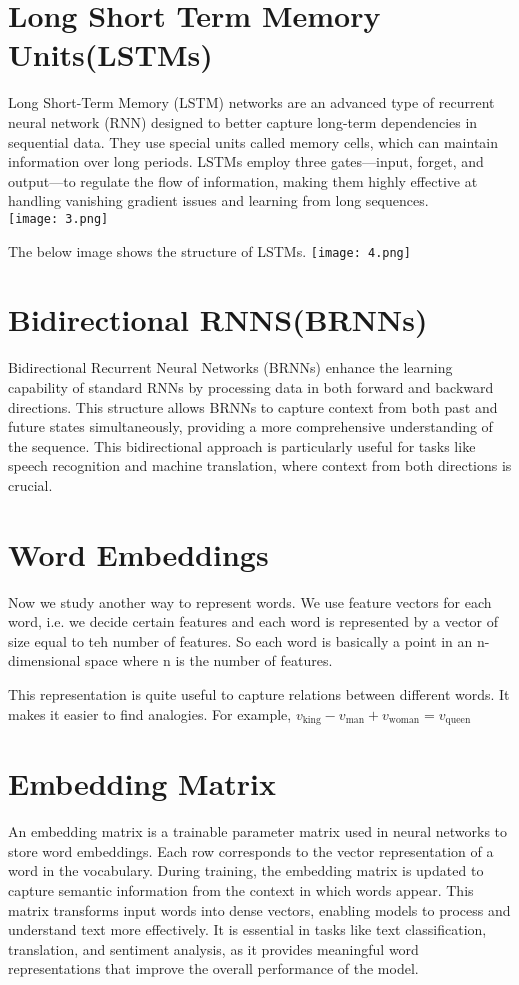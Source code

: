 \documentclass{article}
\begin{document}
\section{\Huge Long Short Term Memory Units(LSTMs)}
Long Short-Term Memory (LSTM) networks are an advanced type of recurrent neural network (RNN) designed to better capture long-term dependencies in sequential data. They use special units called memory cells, which can maintain information over long periods. LSTMs employ three gates—input, forget, and output—to regulate the flow of information, making them highly effective at handling vanishing gradient issues and learning from long sequences. \\

\texttt{[image: 3.png]}

The below image shows the structure of LSTMs.
\texttt{[image: 4.png]}


\section{\Huge Bidirectional RNNS(BRNNs)}
Bidirectional Recurrent Neural Networks (BRNNs) enhance the learning capability of standard RNNs by processing data in both forward and backward directions. This structure allows BRNNs to capture context from both past and future states simultaneously, providing a more comprehensive understanding of the sequence. This bidirectional approach is particularly useful for tasks like speech recognition and machine translation, where context from both directions is crucial.

\section{\Huge Word Embeddings}
Now we study another way to represent words. We use feature vectors for each word, i.e. we decide certain features and each word is represented by a vector of size equal to teh number of features. So each word is basically a point in an n-dimensional space where n is the number of features.

\flushleft
This representation is quite useful to capture relations between different words. It makes it easier to find analogies. For example, $v_{\text{king}} - v_{\text{man}} + v_{\text{woman}} = v_{\text{queen}}$

\section{\Huge Embedding Matrix}
An embedding matrix is a trainable parameter matrix used in neural networks to store word embeddings. Each row corresponds to the vector representation of a word in the vocabulary. During training, the embedding matrix is updated to capture semantic information from the context in which words appear. This matrix transforms input words into dense vectors, enabling models to process and understand text more effectively. It is essential in tasks like text classification, translation, and sentiment analysis, as it provides meaningful word representations that improve the overall performance of the model.
\end{document}
